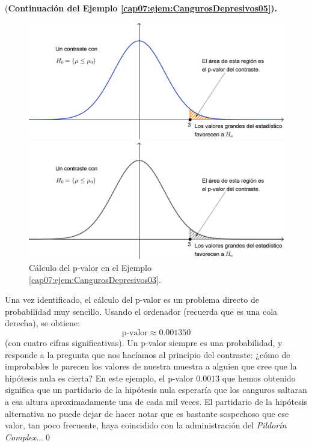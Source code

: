 \begin{enumerate}
\begin{ejemplo}{(\bf Continuación del Ejemplo \ref{cap07:ejem:CangurosDepresivos05}).}
\begin{figure}[htbp]
\begin{center}
\begin{enColor}
\includegraphics[width=13cm]{../fig/Cap07-PValorEjemploCanguros.png}
\end{enColor}
\begin{bn}
\includegraphics[width=13cm]{../fig/Cap07-PValorEjemploCanguros-bn.png}
\end{bn}
\caption{Cálculo del p-valor en el Ejemplo \ref{cap07:ejem:CangurosDepresivos03}.}
\label{cap07:fig:PValorEjemploCanguros}
\end{center}
\end{figure}

        Una vez identificado, el cálculo del p-valor es un problema directo de probabilidad muy sencillo. Usando el ordenador (recuerda que es una cola derecha), se obtiene:
        \[\mbox{p-valor}\approx 0.001350\]
        (con cuatro cifras significativas). Un p-valor siempre es una probabilidad, y responde a la pregunta que nos hacíamos al principio del contraste: ¿cómo de improbables le parecen los valores de nuestra muestra a alguien que cree que la hipótesis nula es cierta? En este ejemplo, el p-valor $0.0013$ que hemos obtenido significa que un partidario de la hipótesis nula esperaría que los canguros saltaran a esa altura aproximadamente una de cada mil veces. El partidario de la hipótesis alternativa no puede dejar de hacer notar que es bastante sospechoso que ese valor, tan poco frecuente, haya coincidido con la administración del {\em Pildorín Complex}...\qed
        \end{ejemplo}
\end{enumerate}
